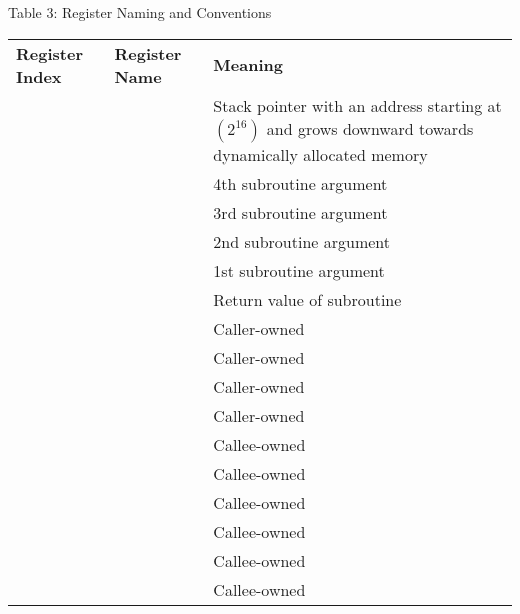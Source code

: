 \documentclass{article}
\begin{document}
\large{Table 3: Register Naming and Conventions}
\centering
\footnotesize
\renewcommand{\arraystretch}{1.4}
\begin{longtable}{ | l | l | P{2.3in} | }
\hline
\textbf{Register Index} & \textbf{Register Name} & \textbf{Meaning} \\ 
 &  & Stack pointer with an address starting at  $(2^{16})$ and grows downward towards dynamically allocated memory \\ \hline
{} &  & 4th subroutine argument \\ \hline
{} &  & 3rd subroutine argument \\ \hline
{} &  & 2nd subroutine argument \\ \hline
{} &  & 1st subroutine argument \\ \hline
{} &  & Return value of subroutine \\ \hline
{} &  & Caller-owned \\ \hline
{} &  & Caller-owned \\ \hline
{} &  & Caller-owned \\ \hline
{} &  & Caller-owned \\ \hline
{} &  & Callee-owned \\ \hline
{} &  & Callee-owned \\ \hline
{} &  & Callee-owned \\ \hline
{} &  & Callee-owned \\ \hline
{} &  & Callee-owned \\ \hline
{} &  & Callee-owned \\ \hline
\end{longtable}
\end{document}
